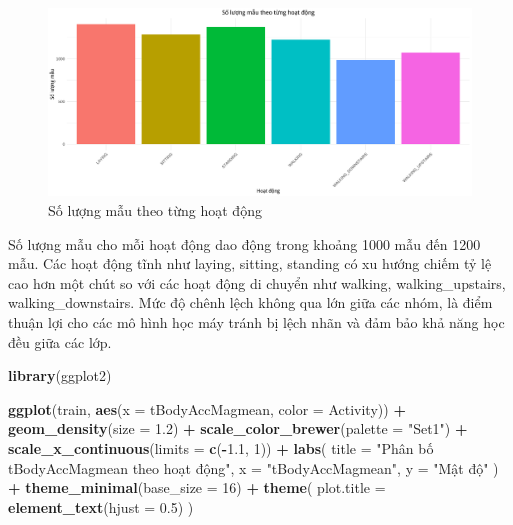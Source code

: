 \documentclass[
]{article}
\newenvironment{Shaded}{\begin{snugshade}}{\end{snugshade}}
\newcommand{\AttributeTok}[1]{\textcolor[rgb]{0.13,0.29,0.53}{#1}}
\newcommand{\DecValTok}[1]{\textcolor[rgb]{0.00,0.00,0.81}{#1}}
\newcommand{\FloatTok}[1]{\textcolor[rgb]{0.00,0.00,0.81}{#1}}
\newcommand{\FunctionTok}[1]{\textcolor[rgb]{0.13,0.29,0.53}{\textbf{#1}}}
\newcommand{\NormalTok}[1]{#1}
\newcommand{\SpecialCharTok}[1]{\textcolor[rgb]{0.81,0.36,0.00}{\textbf{#1}}}
\newcommand{\StringTok}[1]{\textcolor[rgb]{0.31,0.60,0.02}{#1}}
\begin{document}
\begin{figure}
\centering
\includegraphics{report_files/figure-latex/unnamed-chunk-10-1.pdf}
\caption{Số lượng mẫu theo từng hoạt động}
\end{figure}

Số lượng mẫu cho mỗi hoạt động dao động trong khoảng 1000 mẫu đến 1200
mẫu. Các hoạt động tĩnh như laying, sitting, standing có xu hướng chiếm
tỷ lệ cao hơn một chút so với các hoạt động di chuyển như walking,
walking\_upstairs, walking\_downstairs. Mức độ chênh lệch không qua lớn
giữa các nhóm, là điểm thuận lợi cho các mô hình học máy tránh bị lệch
nhãn và đảm bảo khả năng học đều giữa các lớp.

\begin{Shaded}
\begin{Highlighting}[]
\FunctionTok{library}\NormalTok{(ggplot2)}

\FunctionTok{ggplot}\NormalTok{(train, }\FunctionTok{aes}\NormalTok{(}\AttributeTok{x =}\NormalTok{ tBodyAccMagmean, }\AttributeTok{color =}\NormalTok{ Activity)) }\SpecialCharTok{+}
  \FunctionTok{geom\_density}\NormalTok{(}\AttributeTok{size =} \FloatTok{1.2}\NormalTok{) }\SpecialCharTok{+}
  \FunctionTok{scale\_color\_brewer}\NormalTok{(}\AttributeTok{palette =} \StringTok{"Set1"}\NormalTok{) }\SpecialCharTok{+}
  \FunctionTok{scale\_x\_continuous}\NormalTok{(}\AttributeTok{limits =} \FunctionTok{c}\NormalTok{(}\SpecialCharTok{{-}}\FloatTok{1.1}\NormalTok{, }\DecValTok{1}\NormalTok{)) }\SpecialCharTok{+} 
  \FunctionTok{labs}\NormalTok{(}
    \AttributeTok{title =} \StringTok{"Phân bố tBodyAccMagmean theo hoạt động"}\NormalTok{,}
    \AttributeTok{x =} \StringTok{"tBodyAccMagmean"}\NormalTok{,}
    \AttributeTok{y =} \StringTok{"Mật độ"}
\NormalTok{  ) }\SpecialCharTok{+}
  \FunctionTok{theme\_minimal}\NormalTok{(}\AttributeTok{base\_size =} \DecValTok{16}\NormalTok{) }\SpecialCharTok{+}
  \FunctionTok{theme}\NormalTok{(}
    \AttributeTok{plot.title =} \FunctionTok{element\_text}\NormalTok{(}\AttributeTok{hjust =} \FloatTok{0.5}\NormalTok{)}
\NormalTok{  )}
\end{Highlighting}
\end{Shaded}
\end{document}

